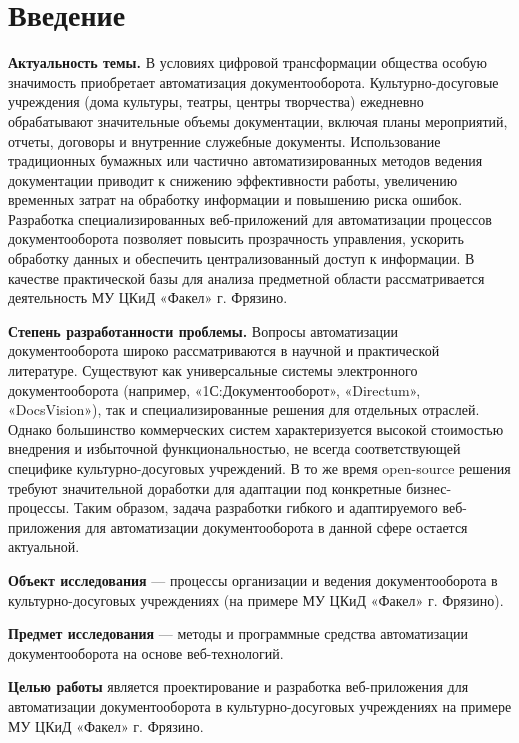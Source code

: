 \section*{Введение}

\textbf{Актуальность темы.} В условиях цифровой трансформации общества особую значимость приобретает автоматизация документооборота. Культурно-досуговые учреждения (дома культуры, театры, центры творчества) ежедневно обрабатывают значительные объемы документации, включая планы мероприятий, отчеты, договоры и внутренние служебные документы. Использование традиционных бумажных или частично автоматизированных методов ведения документации приводит к снижению эффективности работы, увеличению временных затрат на обработку информации и повышению риска ошибок. Разработка специализированных веб-приложений для автоматизации процессов документооборота позволяет повысить прозрачность управления, ускорить обработку данных и обеспечить централизованный доступ к информации. В качестве практической базы для анализа предметной области рассматривается деятельность МУ ЦКиД «Факел» г. Фрязино.

\textbf{Степень разработанности проблемы.} Вопросы автоматизации документооборота широко рассматриваются в научной и практической литературе. Существуют как универсальные системы электронного документооборота (например, «1С:Документооборот», «Directum», «DocsVision»), так и специализированные решения для отдельных отраслей. Однако большинство коммерческих систем характеризуется высокой стоимостью внедрения и избыточной функциональностью, не всегда соответствующей специфике культурно-досуговых учреждений. В то же время open-source решения требуют значительной доработки для адаптации под конкретные бизнес-процессы. Таким образом, задача разработки гибкого и адаптируемого веб-приложения для автоматизации документооборота в данной сфере остается актуальной.

\textbf{Объект исследования} — процессы организации и ведения документооборота в культурно-досуговых учреждениях (на примере МУ ЦКиД «Факел» г. Фрязино).

\textbf{Предмет исследования} — методы и программные средства автоматизации документооборота на основе веб-технологий.

\textbf{Целью работы} является проектирование и разработка веб-приложения для автоматизации документооборота в культурно-досуговых учреждениях на примере МУ ЦКиД «Факел» г. Фрязино.